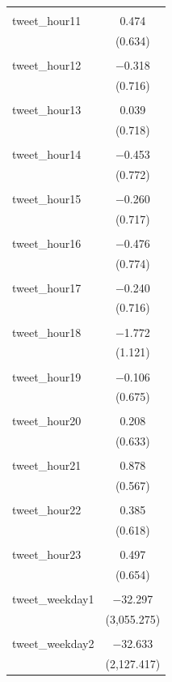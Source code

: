 \documentclass{article}
\begin{document}
\begin{longtable}{@{\extracolsep{10pt}}lc}
  & \\ 
 tweet\_hour11 & 0.474 \\ 
  & (0.634) \\ 
  & \\ 
 tweet\_hour12 & $-$0.318 \\ 
  & (0.716) \\ 
  & \\ 
 tweet\_hour13 & 0.039 \\ 
  & (0.718) \\ 
  & \\ 
 tweet\_hour14 & $-$0.453 \\ 
  & (0.772) \\ 
  & \\ 
 tweet\_hour15 & $-$0.260 \\ 
  & (0.717) \\ 
  & \\ 
 tweet\_hour16 & $-$0.476 \\ 
  & (0.774) \\ 
  & \\ 
 tweet\_hour17 & $-$0.240 \\ 
  & (0.716) \\ 
  & \\ 
 tweet\_hour18 & $-$1.772 \\ 
  & (1.121) \\ 
  & \\ 
 tweet\_hour19 & $-$0.106 \\ 
  & (0.675) \\ 
  & \\ 
 tweet\_hour20 & 0.208 \\ 
  & (0.633) \\ 
  & \\ 
 tweet\_hour21 & 0.878 \\ 
  & (0.567) \\ 
  & \\ 
 tweet\_hour22 & 0.385 \\ 
  & (0.618) \\ 
  & \\ 
 tweet\_hour23 & 0.497 \\ 
  & (0.654) \\ 
  & \\ 
 tweet\_weekday1 & $-$32.297 \\ 
  & (3,055.275) \\ 
  & \\ 
 tweet\_weekday2 & $-$32.633 \\ 
  & (2,127.417) \\ 

\end{longtable}
\end{document}
